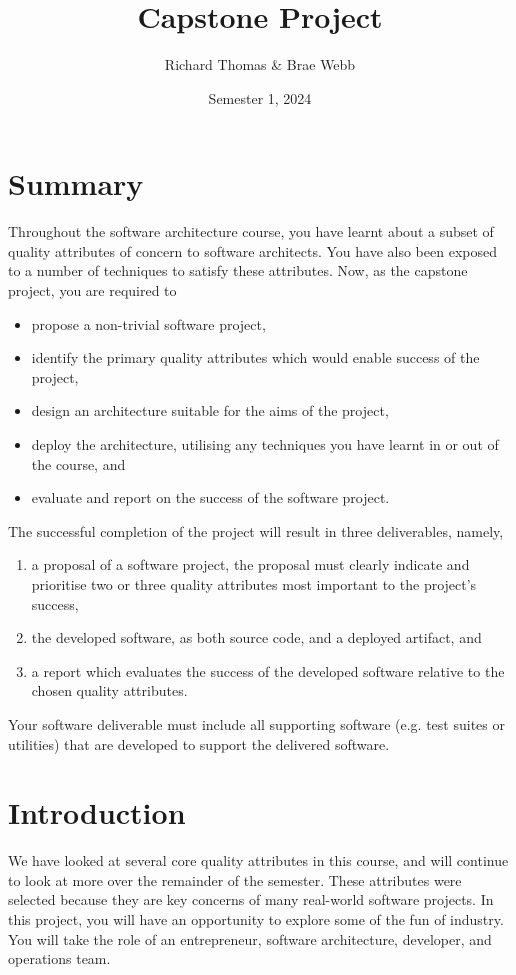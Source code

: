 \documentclass{csse4400}
\title{Capstone Project}
\author{Richard Thomas \& Brae Webb}
\date{Semester 1, 2024}
\begin{document}

\maketitle

\section*{Summary}
Throughout the software architecture course,
you have learnt about a subset of quality attributes of concern to software architects.
You have also been exposed to a number of techniques to satisfy these attributes.
Now, as the capstone project, you are required to
\begin{itemize}
    \item propose a non-trivial software project,
    \item identify the primary quality attributes which would enable success of the project,
    \item design an architecture suitable for the aims of the project,
    \item deploy the architecture, utilising any techniques you have learnt in or out of the course, and
    \item evaluate and report on the success of the software project.
\end{itemize}

\noindent
The successful completion of the project will result in three deliverables, namely,
\begin{enumerate}[label=\roman*]
    \item a proposal of a software project, the proposal must clearly indicate and prioritise two or three quality attributes most important to the project's success,
    \item the developed software, as both source code, and a deployed artifact, and
    \item a report which evaluates the success of the developed software relative to the chosen quality attributes.
\end{enumerate}

\noindent
Your software deliverable must include all supporting software (e.g. test suites or utilities) that are developed to support the delivered software.

\section{Introduction}
We have looked at several core quality attributes in this course, and will continue to look at more over the remainder of the semester.
These attributes were selected because they are key concerns of many real-world software projects.
In this project, you will have an opportunity to explore some of the fun of industry.
You will take the role of an entrepreneur, software architecture, developer, and operations team.
\end{document}
